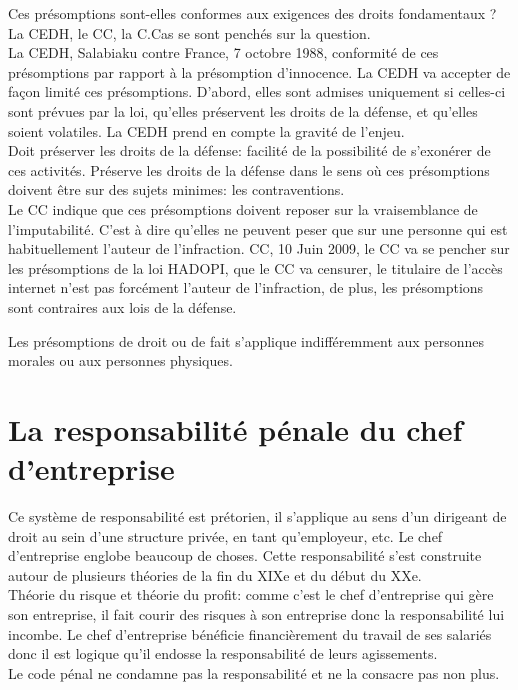 \documentclass[10pt, a4paper, openany]{book}
\begin{document}
Ces présomptions sont-elles conformes aux exigences des droits fondamentaux ? La CEDH, le CC, la C.Cas se sont penchés sur la question. \\
La CEDH, Salabiaku contre France, 7 octobre 1988, conformité de ces présomptions par rapport à la présomption d'innocence. La CEDH va accepter de façon limité ces présomptions. D'abord, elles sont admises uniquement si celles-ci sont prévues par la loi, qu'elles préservent les droits de la défense, et qu'elles soient volatiles. La CEDH prend en compte la gravité de l'enjeu. \\
Doit préserver les droits de la défense: facilité de la possibilité de s'exonérer de ces activités. Préserve les droits de la défense dans le sens où ces présomptions doivent être sur des sujets minimes: les contraventions. \\
Le CC indique que ces présomptions doivent reposer sur la vraisemblance de l'imputabilité. C'est à dire qu'elles ne peuvent peser que sur une personne qui est habituellement l'auteur de l'infraction. CC, 10 Juin 2009, le CC va se pencher sur les présomptions de la loi HADOPI, que le CC va censurer, le titulaire de l'accès internet n'est pas forcément l'auteur de l'infraction, de plus, les présomptions sont contraires aux lois de la défense. 


Les présomptions de droit ou de fait s'applique indifféremment aux personnes morales ou aux personnes physiques. 

\section{La responsabilité pénale du chef d'entreprise}

Ce système de responsabilité est prétorien, il s'applique au sens d'un dirigeant de droit au sein d'une structure privée, en tant qu'employeur, etc. Le chef d'entreprise englobe beaucoup de choses. Cette responsabilité s'est construite autour de plusieurs théories de la fin du XIXe et du début du XXe. \\
Théorie du risque et théorie du profit: comme c'est le chef d'entreprise qui gère son entreprise, il fait courir des risques à son entreprise donc la responsabilité lui incombe. Le chef d'entreprise bénéficie financièrement du travail de ses salariés donc il est logique qu'il endosse la responsabilité de leurs agissements. \\
Le code pénal ne condamne pas la responsabilité et ne la consacre pas non plus. 
\end{document}
